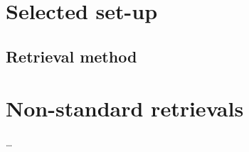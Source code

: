 \section{Selected set-up}
\label{sec:setup}

\subsection{Retrieval method}
\label{sec:setup:inverse}
%





\section{Non-standard retrievals}
\label{sec:nonstandard}
%
\dots









